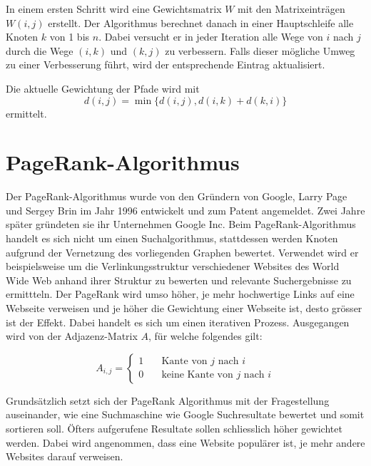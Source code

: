 In einem ersten Schritt wird eine Gewichtsmatrix $W$ mit den Matrixeinträgen $W(i, j)$ erstellt.
Der Algorithmus berechnet danach in einer Hauptschleife alle Knoten $k$ von 1 bis $n$.
Dabei versucht er in jeder Iteration alle Wege von $i$ nach $j$ durch die Wege $(i, k)$ und $(k, j)$ zu verbessern.
Falls dieser mögliche Umweg zu einer Verbesserung führt, wird der entsprechende Eintrag aktualisiert.

Die aktuelle Gewichtung der Pfade wird mit
\begin{equation}d(i, j)=\min\{d(i,j), d(i,k) + d(k,i)\}\end{equation}
ermittelt.



\section{PageRank-Algorithmus}
%
%
%
Der PageRank-Algorithmus wurde von den Gründern von Google, Larry Page und Sergey Brin im Jahr 1996 entwickelt und zum Patent angemeldet. Zwei Jahre später gründeten sie ihr Unternehmen Google Inc.
Beim PageRank-Algorithmus handelt es sich nicht um einen Suchalgorithmus, stattdessen werden Knoten aufgrund der Vernetzung des vorliegenden Graphen bewertet.
Verwendet wird er beispielsweise um die Verlinkungsstruktur verschiedener Websites des World Wide Web anhand ihrer Struktur zu bewerten und relevante Suchergebnisse zu ermittteln. Der PageRank wird umso höher, je mehr hochwertige Links auf eine Webseite verweisen und je höher die Gewichtung einer Webseite ist, desto grösser ist der Effekt.
Dabei handelt es sich um einen iterativen Prozess. Ausgegangen wird von der Adjazenz-Matrix $A$, für welche folgendes gilt:

\begin{equation}
A_{i,j} = \begin{cases}
1&\quad\text{Kante von $j$ nach $i$}\\
0&\quad\text{keine Kante von $j$ nach $i$}
\end{cases}
\label{verkehr:Adja}
\end{equation}

Grundsätzlich setzt sich der PageRank Algorithmus mit der Fragestellung auseinander, wie eine Suchmaschine wie Google Suchresultate bewertet und somit sortieren soll. Öfters aufgerufene Resultate sollen schliesslich höher gewichtet werden. Dabei wird angenommen, dass eine Website populärer ist, je mehr andere Websites darauf verweisen.



